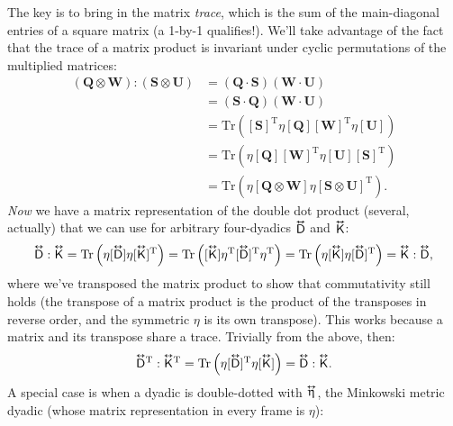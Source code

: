 \documentclass[12pt]{article}
\renewcommand{\vv}[1]{\mathbf{#1}}
\newcommand{\tightoverset}[2]{%
  \mathop{#2}\limits^{\vbox to -.5ex{\kern-0.75ex\hbox{$#1$}\vss}}}
\newcommand{\inlinedy}[1]{\tightoverset{\text{\tiny$\bm\leftrightarrow$}}{#1}}
\newcommand{\capdy}[1]{ \overset{ \text{\tiny$\bm\leftrightarrow$} }{\vphantom{\text{\small{A}}}\smash{#1}} }
\begin{document}
The key is to bring in the matrix \emph{trace}, which is the sum of the main-diagonal entries of a square matrix (a 1-by-1 qualifies!). We'll take advantage of the fact that the trace of a matrix product is invariant under cyclic permutations of the multiplied matrices:
\begin{equation*}
\begin{aligned}
(\vv Q \otimes \vv W) : (\vv S \otimes \vv U) &= (\vv Q \cdot \vv S) (\vv W \cdot \vv U) \\
&= (\vv S \cdot \vv Q) (\vv W \cdot \vv U) \\
&= \mathrm{Tr} \left( [\vv S]^{\mathrm{T}} \eta [\vv Q] [\vv W]^{\mathrm{T}} \eta [\vv U] \right) \\[2pt]
&= \mathrm{Tr} \left( \eta [\vv Q] [\vv W]^{\mathrm{T}} \eta [\vv U] [\vv S]^{\mathrm{T}} \right) \\[2pt]
&= \mathrm{Tr} \left( \eta [\vv Q \otimes \vv W] \eta [\vv S \otimes \vv U]^\mathrm{T} \right).
\end{aligned}
\end{equation*}
\emph{Now} we have a matrix representation of the double dot product (several, actually) that we can use for arbitrary four-dyadics $\inlinedy{\mathsf{D}}$ and $\inlinedy{\mathsf{K}}$:
\begin{equation*}
\capdy{\mathsf{D}} : \capdy{\mathsf{K}} = \mathrm{Tr} \left( \eta [\capdy{\mathsf{D}}] \eta [ \capdy{\mathsf{K}} ]^{\mathrm{T}} \right) = \mathrm{Tr} \left( [\capdy{\mathsf{K}}] \eta^{\mathrm{T}} [ \capdy{\mathsf{D}} ]^{\mathrm{T}} \eta^{\mathrm{T}} \right) = \mathrm{Tr} \left( \eta [\capdy{\mathsf{K}}] \eta [ \capdy{\mathsf{D}} ]^{\mathrm{T}} \right) = \capdy{\mathsf{K}} : \capdy{\mathsf{D}} ,
\end{equation*}
where we've transposed the matrix product to show that commutativity still holds (the transpose of a matrix product is the product of the transposes in reverse order, and the symmetric $\eta$ is its own transpose). This works because a matrix and its transpose share a trace. Trivially from the above, then:
\begin{equation*}
\capdy{\mathsf{D}} \mkern0mu ^\mathrm{T} : \capdy{\mathsf{K}} \mkern0mu ^\mathrm{T} = \mathrm{Tr} \left( \eta [\capdy{\mathsf{D}}]^{\mathrm{T}} \eta [ \capdy{\mathsf{K}} ] \right) = \capdy{\mathsf{D}} : \capdy{\mathsf{K}} .
\end{equation*}
A special case is when a dyadic is double-dotted with $\inlinedy{\upeta}$, the Minkowski metric dyadic (whose matrix representation in every frame is $\eta$):
\end{document}
